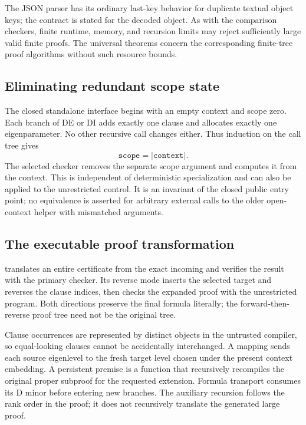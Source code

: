 \documentclass[11pt,letterpaper]{article}
\theoremstyle{definition}
\begin{document}
The JSON parser has its ordinary last-key behavior for duplicate textual
object keys; the contract is stated for the decoded object. As with the
comparison checkers, finite runtime, memory, and recursion limits may
reject sufficiently large valid finite proofs. The universal theorems
concern the corresponding finite-tree proof algorithms without such
resource bounds.

\subsection{Eliminating redundant scope state}

The closed standalone interface begins with an empty context and scope
zero. Each branch of DE or DI adds exactly one clause and allocates
exactly one eigenparameter. No other recursive call changes either.
Thus induction on the call tree gives
\[
          \texttt{scope}=\lvert\texttt{context}\rvert.
\]
The selected checker removes the separate scope argument and computes
it from the context. This is independent of deterministic specialization
and can also be applied to the unrestricted control. It is an invariant
of the closed public entry point; no equivalence is asserted for arbitrary
external calls to the older open-context helper with mismatched arguments.

\subsection{The executable proof transformation}

 translates an entire certificate from the exact
incoming  and verifies the result with
the primary checker. Its reverse mode inserts the selected target and
reverses the clause indices, then checks the expanded proof with the
unrestricted program. Both directions preserve the final formula
literally; the forward-then-reverse proof tree need not be the original
tree.

Clause occurrences are represented by distinct objects in the untrusted
compiler, so equal-looking clauses cannot be accidentally interchanged.
A mapping sends each source eigenlevel to the fresh target level chosen
under the present context embedding. A persistent premise is a function
that recursively recompiles the original proper subproof for the requested
extension. Formula transport consumes its D minor before entering new
branches. The auxiliary recursion follows the rank order in the proof;
it does not recursively translate the generated large proof.
\end{document}
